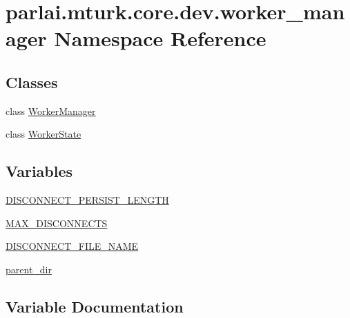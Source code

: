\hypertarget{namespaceparlai_1_1mturk_1_1core_1_1dev_1_1worker__manager}{}\section{parlai.\+mturk.\+core.\+dev.\+worker\+\_\+manager Namespace Reference}
\label{namespaceparlai_1_1mturk_1_1core_1_1dev_1_1worker__manager}
\subsection*{Classes}
\begin{DoxyCompactItemize}
\item 
class \hyperlink{classparlai_1_1mturk_1_1core_1_1dev_1_1worker__manager_1_1WorkerManager}{Worker\+Manager}
\item 
class \hyperlink{classparlai_1_1mturk_1_1core_1_1dev_1_1worker__manager_1_1WorkerState}{Worker\+State}
\end{DoxyCompactItemize}
\subsection*{Variables}
\begin{DoxyCompactItemize}
\item 
\hyperlink{namespaceparlai_1_1mturk_1_1core_1_1dev_1_1worker__manager_a1eedc363a6ac49c0d6cdc9860162fec5}{D\+I\+S\+C\+O\+N\+N\+E\+C\+T\+\_\+\+P\+E\+R\+S\+I\+S\+T\+\_\+\+L\+E\+N\+G\+TH}
\item 
\hyperlink{namespaceparlai_1_1mturk_1_1core_1_1dev_1_1worker__manager_a5e65ad612dc8aec1ff99594ddb7edbf1}{M\+A\+X\+\_\+\+D\+I\+S\+C\+O\+N\+N\+E\+C\+TS}
\item 
\hyperlink{namespaceparlai_1_1mturk_1_1core_1_1dev_1_1worker__manager_a08658e403a471c6373dda88235d58430}{D\+I\+S\+C\+O\+N\+N\+E\+C\+T\+\_\+\+F\+I\+L\+E\+\_\+\+N\+A\+ME}
\item 
\hyperlink{namespaceparlai_1_1mturk_1_1core_1_1dev_1_1worker__manager_a5689f22f8500b82744c68ec513a45972}{parent\+\_\+dir}
\end{DoxyCompactItemize}


\subsection{Variable Documentation}
\mbox{\label{namespaceparlai_1_1mturk_1_1core_1_1dev_1_1worker__manager_a08658e403a471c6373dda88235d58430}} 
